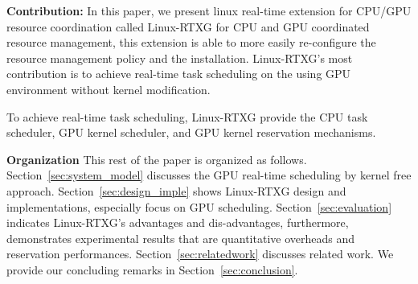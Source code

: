 \textbf{Contribution:}
In this paper, we present linux real-time extension for CPU/GPU resource coordination called Linux-RTXG for CPU and GPU coordinated resource management, this extension is able to more easily re-configure the resource management policy and the installation.
Linux-RTXG's most contribution is to achieve real-time task scheduling on the using GPU environment without kernel modification.

To achieve real-time task scheduling, 
Linux-RTXG provide the CPU task scheduler, GPU kernel scheduler, and GPU kernel reservation mechanisms.

\textbf{Organization}
This rest of the paper is organized as follows.
Section~\ref{sec:system_model} discusses the GPU real-time scheduling by kernel free approach.
Section~\ref{sec:design_imple} shows Linux-RTXG design and implementations, especially focus on GPU scheduling.
Section~\ref{sec:evaluation} indicates Linux-RTXG's advantages and dis-advantages,
furthermore, demonstrates experimental results that are quantitative overheads and reservation performances.
Section~\ref{sec:relatedwork} discusses related work.
We provide our concluding remarks in Section~\ref{sec:conclusion}.
